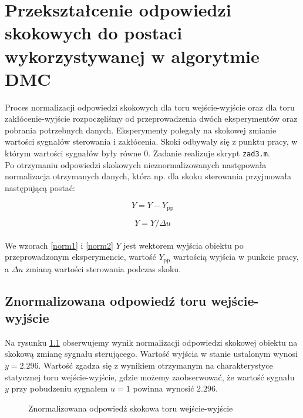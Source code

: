 \chapter{Przekształcenie odpowiedzi skokowych do postaci wykorzystywanej w algorytmie DMC}
\label{zad3}
Proces normalizacji odpowiedzi skokowych dla toru wejście-wyjście oraz dla toru zakłócenie-wyjście rozpoczęliśmy od przeprowadzenia dwóch eksperymentów oraz pobrania potrzebnych danych. Eksperymenty polegały na skokowej zmianie wartości sygnałów sterowania i zakłócenia. Skoki odbywały się z punktu pracy, w którym wartości sygnałów były równe 0. Zadanie realizuje skrypt \verb+zad3.m+.\\
\indent{} Po otrzymaniu odpowiedzi skokowych nieznormalizowanych następowała normalizacja otrzymanych danych, która np. dla skoku sterowania przyjmowała następującą postać:

\begin{equation}
\label{norm1}
Y = Y - Y_{\mathrm{pp}}
\end{equation}

\begin{equation}
\label{norm2}
Y = Y / \Delta u
\end{equation}
\\
We wzorach \ref{norm1} i \ref{norm2} $Y$ jest wektorem wyjścia obiektu po przeprowadzonym eksperymencie, wartość $Y_{\mathrm{pp}}$ wartością wyjścia w punkcie pracy, a $\Delta u$ zmianą wartości sterowania podczas skoku.

\section{Znormalizowana odpowiedź toru wejście-wyjście}
Na rysunku \ref{zad3_norm_odp_u} obserwujemy wynik normalizacji odpowiedzi skokowej obiektu na skokową zmianę sygnału sterującego. Wartość wyjścia w stanie ustalonym wynosi $y = \num{2,296}$. Wartość zgadza się z wynikiem otrzymanym na charakterystyce statycznej toru wejście-wyjście, gdzie możemy zaobserwować, że wartość sygnału $y$ przy pobudzeniu sygnałem $u = 1$ powinna wynosić $\num{2,296}$.   

\begin{figure}[t]
    \centering
    \caption{Znormalizowana odpowiedź skokowa toru wejście-wyjście}
    \label{zad3_norm_odp_u}
\end{figure}


